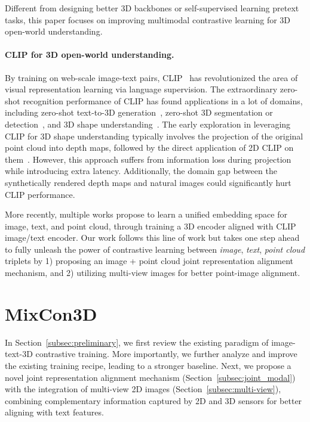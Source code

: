 \documentclass{article} \usepackage{iclr2024_conference,times}
\newcommand{\ourmethod}{MixCon3D}
\begin{document}
Different from designing better 3D backbones or self-supervised learning pretext tasks, this paper focuses on improving multimodal contrastive learning for 3D open-world understanding.

\paragraph{CLIP for 3D open-world understanding.}
By training on web-scale image-text pairs, CLIP~\citep{openai_clip} has revolutionized the area of visual representation learning via language supervision. The extraordinary zero-shot recognition performance of CLIP has found applications in a lot of domains, including zero-shot text-to-3D generation~\citep{hong2022avatarclip,jain2022zero,michel2022text2mesh,sanghi2022clip},
zero-shot 3D segmentation or detection~\citep{jatavallabhula2023conceptfusion,ding2023pla,yang2023regionplc,lu2023open},
and 3D shape understanding~\citep{zhang2022pointclip,zhu2022pointclipv2,ulip,ulip2,qi2023recon,clip_goes_3d,vit-lens, Uni3D}.
The early exploration in leveraging CLIP for 3D shape understanding typically involves the projection of the original point cloud into depth maps, followed by the direct application of 2D CLIP on them~\citep{zhang2022pointclip,zhu2022pointclipv2}. 
However, this approach suffers from information loss during projection while introducing extra latency.
Additionally, the domain gap between the synthetically rendered depth maps and natural images could significantly hurt CLIP performance. 

More recently, multiple works \citep{ulip,ulip2,openshape} propose to learn a unified embedding space for image, text, and point cloud, through training a 3D encoder aligned with CLIP image/text encoder.
Our work follows this line of work but takes one step ahead to fully unleash the power of contrastive learning between \textit{image}, \textit{text}, \textit{point cloud} triplets by 1) proposing an image + point cloud joint representation alignment mechanism, and 2) utilizing multi-view images for better point-image alignment.

\section{\ourmethod}
\label{sec:review}
In Section~\ref{subsec:preliminary}, we first review the existing paradigm of image-text-3D contrastive training. 
More importantly, we further analyze and improve the existing training recipe, leading to a stronger baseline.
Next, we propose a novel joint representation alignment mechanism (Section~\ref{subsec:joint_modal}) with the integration of multi-view 2D images (Section~\ref{subsec:multi-view}), combining complementary information captured by 2D and 3D sensors for better aligning with text features. 
\end{document}
